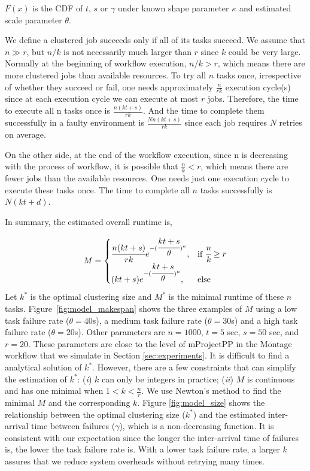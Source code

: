 \documentclass{IOS-Book-Article}
\begin{document}
$F(x)$ is the CDF of $t$, $s$ or $\gamma$ under known shape parameter $\kappa$ and estimated scale parameter $\theta$. 

We define a clustered job succeeds only if all of its tasks succeed. We assume that $n \gg r$, but $n/k$ is not necessarily much larger than $r$ since $k$ could be very large. Normally at the beginning of workflow execution, $n/k > r$, which means there are more clustered jobs than available resources. To try all $n$ tasks once, irrespective of whether they succeed or fail, one needs approximately $\displaystyle \frac{n}{rk}$ execution cycle(s) since at each execution cycle we can execute at most $r$ jobs. Therefore, the time to execute all n tasks once is $\displaystyle\frac{n(kt+s)}{rk}$. And the time to complete them successfully in a faulty environment is $\displaystyle\frac{Nn(kt+s)}{rk} $ since each job requires $N$ retries on average.  

On the other side, at the end of the workflow execution, since n is decreasing with the process of workflow, it is possible that $\displaystyle \frac{n}{k} < r$, which means there are fewer jobs than the available resources. One needs just one execution cycle to execute these tasks once. The time to complete all $n$ tasks successfully is $N(kt+d)$. 

In summary, the estimated overall runtime is, 

\begin{equation} 
\label{eq:jfm}
M=
\begin{cases}
\cfrac{n(kt+s)}{rk}{e^{-(\cfrac{kt+s}{\theta})^{\kappa}}}, & \text{if } \cfrac{n}{k}\geq r \\
(kt+s){e^{-(\cfrac{kt+s}{\theta})^{\kappa}}}, & \text{else}
\end{cases}
\end{equation}
Let $k^*$ is the optimal clustering size and $M^*$ is the minimal runtime of these $n$ tasks.  Figure~\ref{fig:model_makespan} shows the three examples of $M$ using a low task failure rate ($\theta=40$s), a medium task failure rate ($\theta=30$s) and a high task failure rate ($\theta=20$s). Other parameters are $n=1000$, $t=5$ sec, $s=50$ sec, and $r=20$. These parameters are close to the level of mProjectPP in the Montage workflow that we simulate in Section \ref{sec:experiments}. It is difficult to find a analytical solution of $k^*$. However, there are a few constraints that can simplify the estimation of $k^*$: (\emph{i}) $k$ can only be integers in practice; (\emph{ii}) $M$ is continuous and has one minimal when $\displaystyle 1<k<\frac{n}{r}$. We use Newton's method to find the minimal $M$ and the corresponding $k$. Figure \ref{fig:model_size} shows the relationship between the optimal clustering size ($k^*$) and the estimated inter-arrival time between failures ($\gamma$), which is a non-decreasing function. It is consistent with our expectation since the longer the inter-arrival time of failures is, the lower the task failure rate is. With a lower task failure rate, a larger $k$ assures that we reduce system overheads without retrying many times.  
\end{document}
